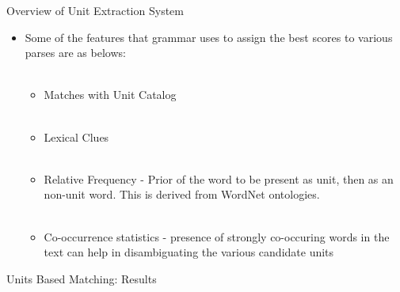 \documentclass{beamer}
\begin{document}
\begin{frame}{Overview of Unit Extraction System}
 \begin{itemize}
  \item Some of the features that grammar uses to assign the best scores to various 
parses are as belows: \pause \\~\\
    \begin{itemize}
        \item Matches with Unit Catalog \pause \\~\\
	\item Lexical Clues \pause \\~\\
	\item Relative Frequency - Prior of the word to be present as unit, then as an
	  non-unit word. This is derived from WordNet ontologies. \pause \\~\\
	\item Co-occurrence statistics - presence of strongly co-occuring words in the
	  text can help in disambiguating the various candidate units 
    \end{itemize}
 \end{itemize}
 
\end{frame}

\begin{frame}{Units Based Matching: Results}
\begin{center}
\end{center}

\end{frame}
\end{document}
